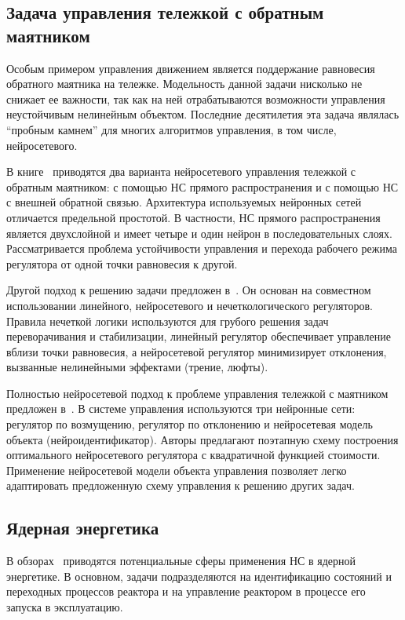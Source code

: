 \subsection{Задача управления тележкой с обратным маятником}

Особым примером управления движением является поддержание равновесия
обратного маятника на тележке.  Модельность данной задачи нисколько не
снижает ее важности, так как на ней отрабатываются возможности
управления неустойчивым нелинейным объектом.  Последние десятилетия
эта задача являлась ``пробным камнем'' для многих алгоритмов
управления, в том числе, нейросетевого.

В книге~\cite{suykens96} приводятся два варианта нейросетевого
управления тележкой с обратным маятником: с помощью НС прямого
распространения и с помощью НС с внешней обратной связью.  Архитектура
используемых нейронных сетей отличается предельной простотой.  В
частности, НС прямого распространения является двухслойной и имеет
четыре и один нейрон в последовательных слоях.  Рассматривается
проблема устойчивости управления и перехода рабочего режима регулятора
от одной точки равновесия к другой.

Другой подход к решению задачи предложен в~\cite{sigom00}.  Он основан
на совместном использовании линейного, нейросетевого и
нечеткологического регуляторов.  Правила нечеткой логики используются
для грубого решения задач переворачивания и стабилизации, линейный
регулятор обеспечивает управление вблизи точки равновесия, а
нейросетевой регулятор минимизирует отклонения, вызванные нелинейными
эффектами (трение, люфты).

Полностью нейросетевой подход к проблеме управления тележкой с
маятником предложен в~\cite{park96}.  В системе управления
используются три нейронные сети: регулятор по возмущению, регулятор по
отклонению и нейросетевая модель объекта (нейроидентификатор).  Авторы
предлагают поэтапную схему построения оптимального нейросетевого
регулятора с квадратичной функцией стоимости.  Применение нейросетевой
модели объекта управления позволяет легко адаптировать предложенную
схему управления к решению других задач.

\subsection{Ядерная энергетика}

В обзорах~\cite{uhrig91}\cite{zhuchkov02} приводятся потенциальные
сферы применения НС в ядерной энергетике.  В основном, задачи
подразделяются на идентификацию состояний и переходных процессов
реактора и на управление реактором в процессе его запуска в
эксплуатацию.


